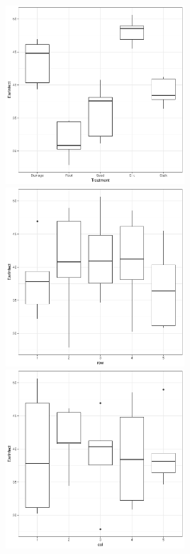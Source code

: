 \documentclass[a4paper, 10pt, fleqn, twosided]{memoir}
\begin{document}
\begin{tcolorbox}[title = Exercise 5 output]
\includegraphics[width=0.5\textwidth, frame]{Exercise5trt_boxplot.pdf}
\includegraphics[width=0.5\textwidth, frame]{Exercise5row_boxplot.pdf}
\includegraphics[width=0.5\textwidth, frame]{Exercise5col_boxplot.pdf}
\end{tcolorbox}
\end{document}
